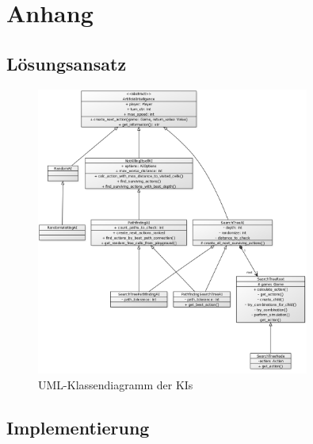 \chapter{Anhang}
\label{ch:anhang}

\section{Lösungsansatz}
\label{sec:anhang-loesungsansatz}

\begin{figure}[htb]
	\centering
	\includegraphics[width=0.8\textwidth]{Bilder/Klassendiagramm_AIs.png}
	\caption{UML-Klassendiagramm der \ac{KI}s}
	\label{fig:klassendiagramm-AIs}
\end{figure}

\section{Implementierung}
\label{sec:anhang-implementierung}

